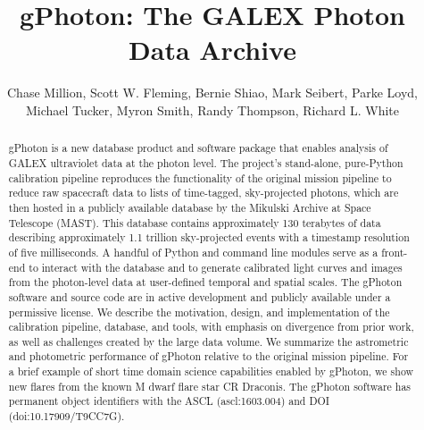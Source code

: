 \documentclass[trackchanges,preprint2]{aastex}
\begin{document}
\title{gPhoton: The GALEX Photon Data Archive}

\author{
  Chase Million,
  Scott W. Fleming,
  Bernie Shiao,
  Mark Seibert,
  Parke Loyd,
  Michael Tucker,
  Myron Smith,
  Randy Thompson,
  Richard L. White
}



\begin{abstract}
gPhoton is a new database product and software package that enables analysis of GALEX ultraviolet data at the photon level. The project's stand-alone, pure-Python calibration pipeline reproduces the functionality of the original mission pipeline to reduce raw spacecraft data to lists of time-tagged, sky-projected photons, which are then hosted in a publicly available database by the Mikulski Archive at Space Telescope (MAST). This database contains approximately 130 terabytes of data describing approximately 1.1 trillion sky-projected events with a timestamp resolution of five milliseconds. A handful of Python and command line modules serve as a front-end to interact with the database and to generate calibrated light curves and images from the photon-level data at user-defined temporal and spatial scales. The gPhoton software and source code are in active development and publicly available under a permissive license. We describe the motivation, design, and implementation of the calibration pipeline, database, and tools, with emphasis on divergence from prior work, as well as challenges created by the large data volume. We summarize the astrometric and photometric performance of gPhoton relative to the original mission pipeline. For a brief example of short time domain science capabilities enabled by gPhoton, we show new flares from the known M dwarf flare star CR Draconis. The gPhoton software has permanent object identifiers with the ASCL (ascl:1603.004) and DOI (doi:10.17909/T9CC7G). 
\end{abstract}
\end{document}
